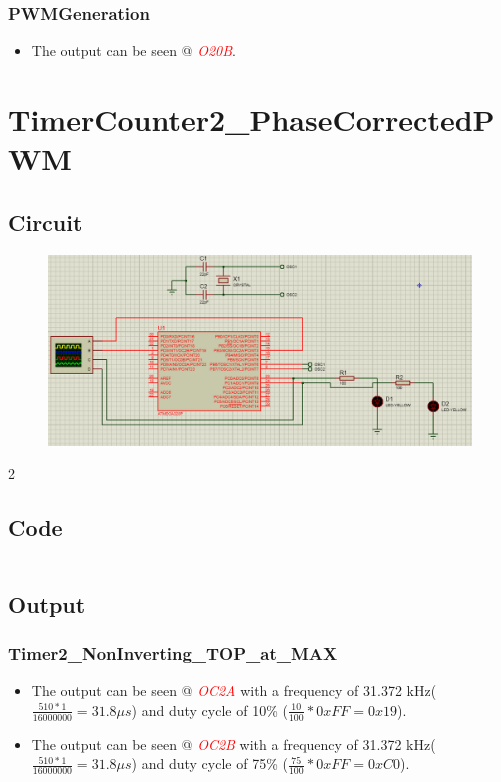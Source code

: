 \documentclass[oneside]{book}
\newcommand{\pinFormat}[1]{\emph{\textcolor{red}{#1}}}
\begin{document}
\subsubsection{PWMGeneration}
\begin{itemize}
    \item The output can be seen @ \pinFormat{O20B}.
\end{itemize}

\section{TimerCounter2\_PhaseCorrectedPWM}
\subsection{Circuit}
\begin{figure}[H]
    \centering
    \includegraphics[height=0.2\textheight]{TimerCounter2_PhaseCorrectedPWM.png}
\end{figure}2
\subsection{Code}
\inputminted[breaklines, bgcolor=black]{c}{./programFiles/TimerCounter2_PhaseCorrectedPWM.c}
\subsection{Output}
\subsubsection{Timer2\_NonInverting\_TOP\_at\_MAX}
\begin{itemize}
    \item The output can be seen @ \pinFormat{OC2A} with a frequency of 31.372 kHz($\frac{510 * 1}{16000000} = 31.8\mu s$) and duty cycle of 10\% ($\frac{10}{100} * 0xFF = 0x19$).
    \item The output can be seen @ \pinFormat{OC2B} with a frequency of 31.372 kHz($\frac{510 * 1}{16000000} = 31.8\mu s$) and duty cycle of 75\% ($\frac{75}{100} * 0xFF = 0xC0$).
\end{itemize}
\end{document}
